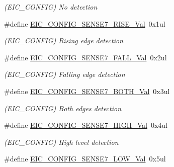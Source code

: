 \begin{DoxyCompactItemize}
\begin{DoxyCompactList}\small\item\em (E\+I\+C\+\_\+\+C\+O\+N\+F\+I\+G) No detection \end{DoxyCompactList}\item 
\hypertarget{group___s_a_m_l21___e_i_c_ga84e2898643261f390c3f329d59357cb6}{}\#define \hyperlink{group___s_a_m_l21___e_i_c_ga84e2898643261f390c3f329d59357cb6}{E\+I\+C\+\_\+\+C\+O\+N\+F\+I\+G\+\_\+\+S\+E\+N\+S\+E7\+\_\+\+R\+I\+S\+E\+\_\+\+Val}~0x1ul\label{group___s_a_m_l21___e_i_c_ga84e2898643261f390c3f329d59357cb6}

\begin{DoxyCompactList}\small\item\em (E\+I\+C\+\_\+\+C\+O\+N\+F\+I\+G) Rising edge detection \end{DoxyCompactList}\item 
\hypertarget{group___s_a_m_l21___e_i_c_ga456906de38943b836b26294cd9735251}{}\#define \hyperlink{group___s_a_m_l21___e_i_c_ga456906de38943b836b26294cd9735251}{E\+I\+C\+\_\+\+C\+O\+N\+F\+I\+G\+\_\+\+S\+E\+N\+S\+E7\+\_\+\+F\+A\+L\+L\+\_\+\+Val}~0x2ul\label{group___s_a_m_l21___e_i_c_ga456906de38943b836b26294cd9735251}

\begin{DoxyCompactList}\small\item\em (E\+I\+C\+\_\+\+C\+O\+N\+F\+I\+G) Falling edge detection \end{DoxyCompactList}\item 
\hypertarget{group___s_a_m_l21___e_i_c_ga461a0f4bd20a83b7c935ba3fb4e640ac}{}\#define \hyperlink{group___s_a_m_l21___e_i_c_ga461a0f4bd20a83b7c935ba3fb4e640ac}{E\+I\+C\+\_\+\+C\+O\+N\+F\+I\+G\+\_\+\+S\+E\+N\+S\+E7\+\_\+\+B\+O\+T\+H\+\_\+\+Val}~0x3ul\label{group___s_a_m_l21___e_i_c_ga461a0f4bd20a83b7c935ba3fb4e640ac}

\begin{DoxyCompactList}\small\item\em (E\+I\+C\+\_\+\+C\+O\+N\+F\+I\+G) Both edges detection \end{DoxyCompactList}\item 
\hypertarget{group___s_a_m_l21___e_i_c_ga90352dd0ca9acbd823c87862d2046489}{}\#define \hyperlink{group___s_a_m_l21___e_i_c_ga90352dd0ca9acbd823c87862d2046489}{E\+I\+C\+\_\+\+C\+O\+N\+F\+I\+G\+\_\+\+S\+E\+N\+S\+E7\+\_\+\+H\+I\+G\+H\+\_\+\+Val}~0x4ul\label{group___s_a_m_l21___e_i_c_ga90352dd0ca9acbd823c87862d2046489}

\begin{DoxyCompactList}\small\item\em (E\+I\+C\+\_\+\+C\+O\+N\+F\+I\+G) High level detection \end{DoxyCompactList}\item 
\hypertarget{group___s_a_m_l21___e_i_c_ga090c5aaf967e49c1634a02bae7799fa6}{}\#define \hyperlink{group___s_a_m_l21___e_i_c_ga090c5aaf967e49c1634a02bae7799fa6}{E\+I\+C\+\_\+\+C\+O\+N\+F\+I\+G\+\_\+\+S\+E\+N\+S\+E7\+\_\+\+L\+O\+W\+\_\+\+Val}~0x5ul\label{group___s_a_m_l21___e_i_c_ga090c5aaf967e49c1634a02bae7799fa6}


\end{DoxyCompactItemize}
